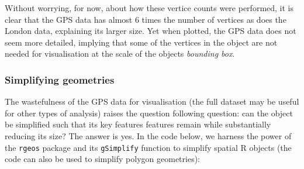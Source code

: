 \documentclass[]{article}
\begin{document}
Without worrying, for now, about how these vertice counts were
performed, it is clear that the GPS data has almost 6 times the number
of vertices as does the London data, explaining its larger size. Yet
when plotted, the GPS data does not seem more detailed, implying that
some of the vertices in the object are not needed for visualisation at
the scale of the objects \emph{bounding box}.

\subsubsection{Simplifying geometries}

The wastefulness of the GPS data for visualisation (the full dataset may
be useful for other types of analysis) raises the question following
question: can the object be simplified such that its key features
features remain while substantially reducing its size? The answer is
yes. In the code below, we harness the power of the \texttt{rgeos}
package and its \texttt{gSimplify} function to simplify spatial R
objects (the code can also be used to simplify polygon geometries):
\end{document}

